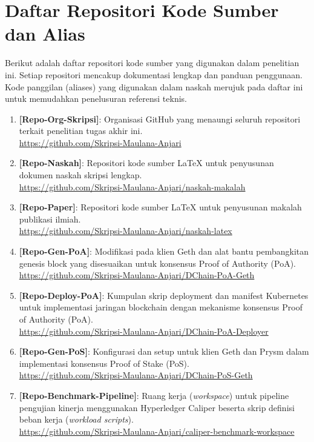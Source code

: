 \clearpage
\section{Daftar Repositori Kode Sumber dan Alias}

Berikut adalah daftar repositori kode sumber yang digunakan dalam penelitian ini. Setiap repositori mencakup dokumentasi lengkap dan panduan penggunaan. Kode panggilan (aliases) yang digunakan dalam naskah merujuk pada daftar ini untuk memudahkan penelusuran referensi teknis.

\begin{enumerate}
    \item \textbf{[Repo-Org-Skripsi]}: Organisasi GitHub yang menaungi seluruh repositori terkait penelitian tugas akhir ini.\\
    \url{https://github.com/Skripsi-Maulana-Anjari}
    
    \item \textbf{[Repo-Naskah]}: Repositori kode sumber LaTeX untuk penyusunan dokumen naskah skripsi lengkap.\\
    \url{https://github.com/Skripsi-Maulana-Anjari/naskah-makalah}
    
    \item \textbf{[Repo-Paper]}: Repositori kode sumber LaTeX untuk penyusunan makalah publikasi ilmiah.\\
    \url{https://github.com/Skripsi-Maulana-Anjari/naskah-latex}

    \item \textbf{[Repo-Gen-PoA]}: Modifikasi pada klien Geth dan alat bantu pembangkitan genesis block yang disesuaikan untuk konsensus Proof of Authority (PoA).\\
    \url{https://github.com/Skripsi-Maulana-Anjari/DChain-PoA-Geth}

    \item \textbf{[Repo-Deploy-PoA]}: Kumpulan skrip deployment dan manifest Kubernetes untuk implementasi jaringan blockchain dengan mekanisme konsensus Proof of Authority (PoA).\\
    \url{https://github.com/Skripsi-Maulana-Anjari/DChain-PoA-Deployer}

    \item \textbf{[Repo-Gen-PoS]}: Konfigurasi dan setup untuk klien Geth dan Prysm dalam implementasi konsensus Proof of Stake (PoS).\\
    \url{https://github.com/Skripsi-Maulana-Anjari/DChain-PoS-Geth}

    \item \textbf{[Repo-Benchmark-Pipeline]}: Ruang kerja (\textit{workspace}) untuk pipeline pengujian kinerja menggunakan Hyperledger Caliper beserta skrip definisi beban kerja (\textit{workload scripts}).\\
    \url{https://github.com/Skripsi-Maulana-Anjari/caliper-benchmark-workspace}


\end{enumerate}
